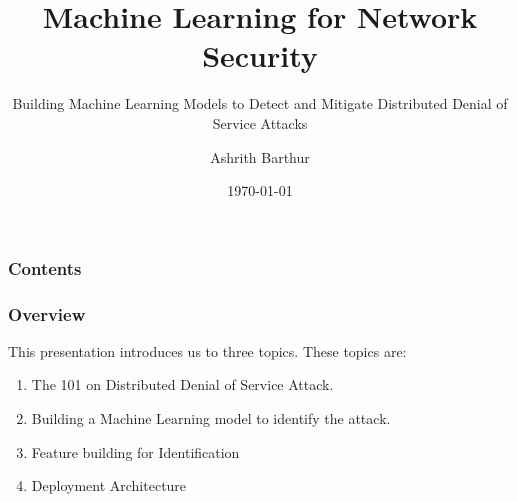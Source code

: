 \documentclass[11pt,
               aspectratio=169,
               hyperref={colorlinks}
               ]{beamer}
\author{Ashrith Barthur}
\title{Machine Learning for Network Security}
\subtitle{Building Machine Learning Models to Detect and Mitigate Distributed Denial of Service Attacks}
\institute{\href{https://www.h2o.ai}{H\textsubscript{2}O.ai}}
\date{\today}
\begin{document}
	
	\maketitle
	
	\begin{frame}
	
		\frametitle{Contents}
		
		\tableofcontents{}
		
	\end{frame}

	\begin{frame}
		\frametitle{Overview}

		This presentation introduces us to three topics. These topics are:
		\begin{enumerate}
                \item The 101 on Distributed Denial of Service Attack.
                \item Building a Machine Learning model to identify the attack. 
                \item Feature building for Identification
                \item Deployment Architecture
		\end{enumerate}
	\end{frame}
\end{document}
